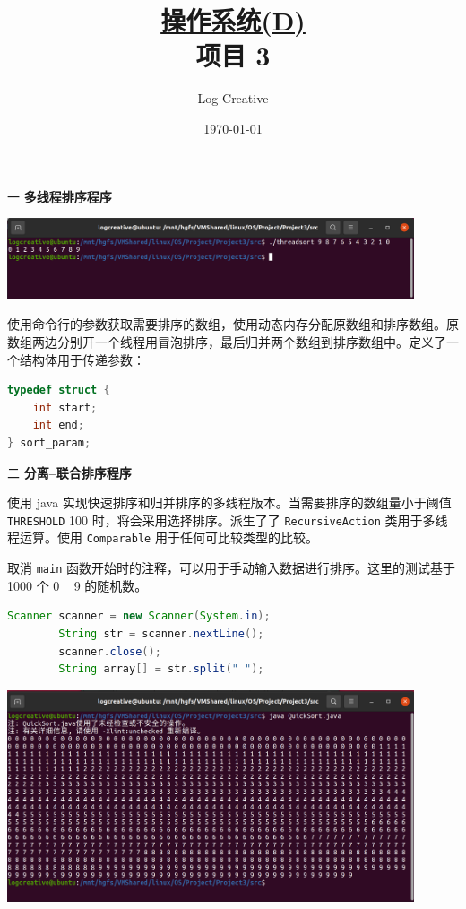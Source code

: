 \documentclass[12pt,a4paper]{article}
\newenvironment{problems}{\begin{list}{}{\renewcommand{\makelabel}[1]{\textbf{##1}\hfil}}}{\end{list}}
\providecommand{\code}[2]{}
\begin{document}
\title{\normalsize \underline{操作系统(D)}\\\LARGE 项目 3}
\author{Log Creative }
\date{\today}
\maketitle

\begin{problems}
    \item[一] \textbf{多线程排序程序}
    
    \includegraphics[width=0.9\textwidth]{threadsort.png}

    使用命令行的参数获取需要排序的数组，使用动态内存分配原数组和排序数组。原数组两边分别开一个线程用冒泡排序，最后归并两个数组到排序数组中。定义了一个结构体用于传递参数：
    \begin{lstlisting}[language=c]
typedef struct {
    int start;
    int end;
} sort_param;
    \end{lstlisting}

    \code{src/threadsort.c}{c}

    \item[二] \textbf{分离--联合排序程序} 
    
    使用 java 实现快速排序和归并排序的多线程版本。当需要排序的数组量小于阈值 \verb"THRESHOLD" 100 时，将会采用选择排序。派生了了 \verb"RecursiveAction" 类用于多线程运算。使用 \verb"Comparable" 用于任何可比较类型的比较。

    取消 \verb"main" 函数开始时的注释，可以用于手动输入数据进行排序。这里的测试基于 1000 个 0 ~ 9 的随机数。
    \begin{lstlisting}[language=java]
        Scanner scanner = new Scanner(System.in);
        String str = scanner.nextLine();
        scanner.close();
        String array[] = str.split(" ");
    \end{lstlisting}

    \includegraphics[width=0.9\textwidth]{quicksort.png}


\end{problems}
\end{document}

